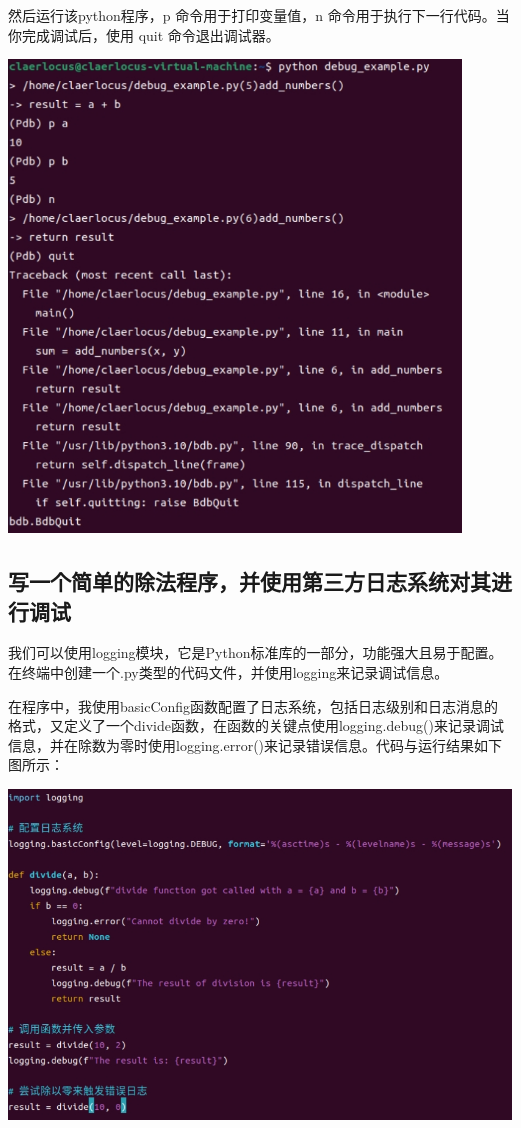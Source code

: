\documentclass[UTF8,a4paper]{ctexart}
\begin{document}
\begin{sloppypar}
	然后运行该python程序，p 命令用于打印变量值，n 命令用于执行下一行代码。当你完成调试后，使用 quit 命令退出调试器。
	
	\includegraphics[width = 12cm]{16}

	\subsection{写一个简单的除法程序，并使用第三方日志系统对其进行调试}
	我们可以使用logging模块，它是Python标准库的一部分，功能强大且易于配置。在终端中创建一个.py类型的代码文件，并使用logging来记录调试信息。
	
	在程序中，我使用basicConfig函数配置了日志系统，包括日志级别和日志消息的格式，又定义了一个divide函数，在函数的关键点使用logging.debug()来记录调试信息，并在除数为零时使用logging.error()来记录错误信息。代码与运行结果如下图所示：
	
	\includegraphics[width = 14cm]{17}
	

\end{sloppypar}
\end{document}
